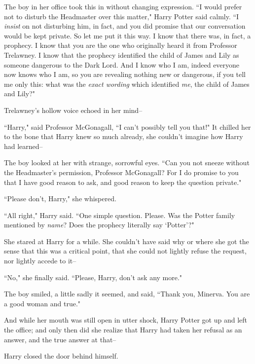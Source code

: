 The boy in her office took this in without changing expression. ``I would prefer not to disturb the Headmaster over this matter," Harry Potter said calmly. ``I \emph{insist} on not disturbing him, in fact, and you did promise that our conversation would be kept private. So let me put it this way. I know that there was, in fact, a prophecy. I know that you are the one who originally heard it from Professor Trelawney. I know that the prophecy identified the child of James and Lily as someone dangerous to the Dark Lord. And I know who I am, indeed everyone now knows who I am, so you are revealing nothing new or dangerous, if you tell me only this: what was the \emph{exact wording} which identified \emph{me}, the child of James and Lily?"

Trelawney's hollow voice echoed in her mind\---


``Harry," said Professor McGonagall, ``I can't possibly tell you that!" It chilled her to the bone that Harry knew so much already, she couldn't imagine how Harry had learned\---

The boy looked at her with strange, sorrowful eyes. ``Can you not sneeze without the Headmaster's permission, Professor McGonagall? For I do promise to you that I have good reason to ask, and good reason to keep the question private."

``Please don't, Harry," she whispered.

``All right," Harry said. ``One simple question. Please. Was the Potter family mentioned by \emph{name}? Does the prophecy literally say `Potter'?"

She stared at Harry for a while. She couldn't have said why or where she got the sense that this was a critical point, that she could not lightly refuse the request, nor lightly accede to it\---

``No," she finally said. ``Please, Harry, don't ask any more."

The boy smiled, a little sadly it seemed, and said, ``Thank you, Minerva. You are a good woman and true." %

And while her mouth was still open in utter shock, Harry Potter got up and left the office; and only then did she realize that Harry had taken her refusal as an answer, and the true answer at that\---

Harry closed the door behind himself.


